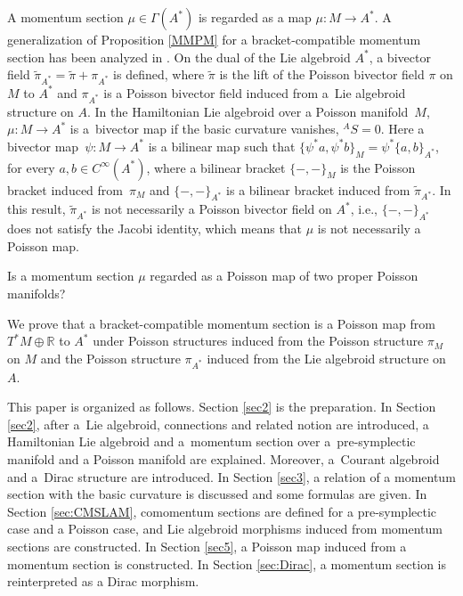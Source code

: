 \documentclass[10pt,a4paper]{amsart}
\numberwithin{equation}{section}
\def\bR{{\mathbb{R}}}
\newcommand{\sbv}[2]{{\{{{#1},{#2}}\}}}
\newcommand{\wpi}{{\widetilde{\pi}}}
\begin{document}
A momentum section $\mu \in \Gamma(A^*)$ is regarded as a map $\mu\colon M \rightarrow A^*$.
A generalization of Proposition \ref{MMPM} for a bracket-compatible momentum section has been analyzed in \cite{Blohmann:2023}.
On the dual of the Lie algebroid $A^*$, a bivector field
$\wpi_{A^*} = \wpi + \pi_{A^*}$ is defined, where $\wpi$
is the lift of the Poisson bivector field $\pi$ on $M$ to $A^*$
and $\pi_{A^*}$ is a Poisson bivector field induced from a~Lie algebroid structure on $A$.
In the Hamiltonian Lie algebroid over a Poisson manifold~$M$,
${\mu\colon M \rightarrow A^*}$ is a~bivector map
if the basic curvature vanishes, ${}^A S =0$.
Here a bivector map~${\psi\colon M \rightarrow A^*}$ is a bilinear map such that
$
\sbv{\psi^* a}{\psi^* b}_M = \psi^* \sbv{a}{b}_{A^*}$,
for every $a, b \in C^{\infty}(A^*)$,
where a bilinear bracket
$\sbv{-}{-}_M$ is the Poisson bracket induced from~$\pi_M$
and $\sbv{-}{-}_{A^*}$ is a bilinear bracket induced from $\wpi_{A^*}$.
In this result, $\wpi_{A^*}$ is not necessarily a Poisson bivector field on $A^*$, i.e., $\sbv{-}{-}_{A^*}$ does not satisfy the Jacobi identity, which means that $\mu$ is not necessarily a Poisson map.

\begin{Question}
Is a momentum section $\mu$ regarded as a Poisson map of two proper Poisson manifolds?
\end{Question}

We prove that a bracket-compatible momentum section is a
Poisson map from $T^*M \oplus \bR$ to $A^*$ under Poisson structures
induced from the Poisson structure $\pi_M$ on $M$ and
the Poisson structure $\pi_{A^*}$ induced from
the Lie algebroid structure on $A$.

This paper is organized as follows.
Section \ref{sec2} is the preparation.
In Section \ref{sec2}, after a~Lie algebroid, connections
and related notion are introduced,
a Hamiltonian Lie algebroid and a~momentum section over a~pre-symplectic manifold and a Poisson manifold are explained.
Moreover, a~Courant algebroid and a~Dirac structure are introduced.
In Section \ref{sec3}, a relation of a momentum section
with the basic curvature is discussed and some formulas are given.
In Section \ref{sec:CMSLAM}, comomentum sections are defined for
a pre-symplectic case and a Poisson case, and Lie algebroid morphisms
induced from momentum sections are constructed.
In Section \ref{sec5}, a Poisson map induced from a momentum section is constructed.
In Section \ref{sec:Dirac}, a momentum section is reinterpreted as a Dirac morphism.
\end{document}
